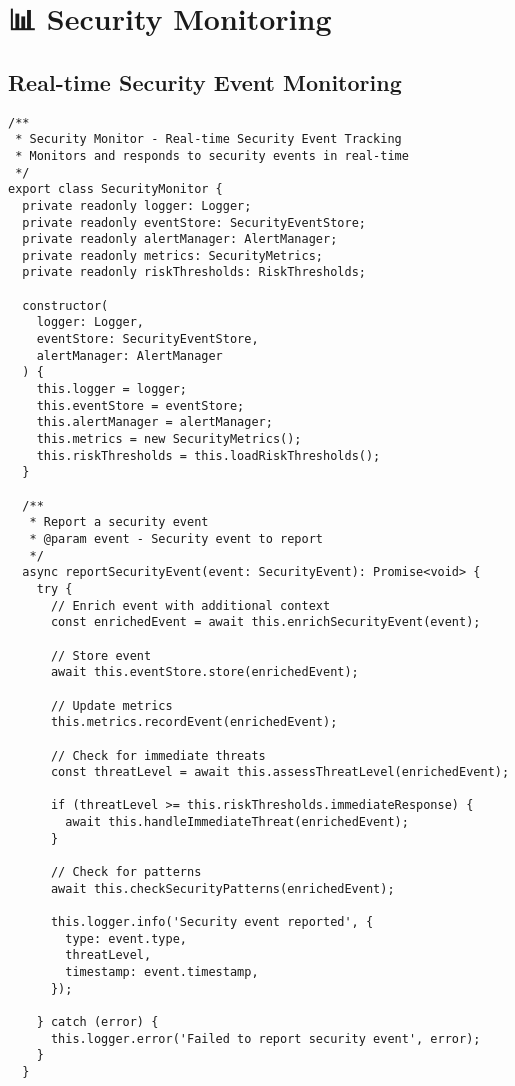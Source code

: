 \documentclass[11pt,a4paper]{article}
\begin{document}
\section{📊 Security Monitoring}

\subsection{Real-time Security Event Monitoring}

\begin{lstlisting}[style=typescript, caption=Security Monitoring System]
/**
 * Security Monitor - Real-time Security Event Tracking
 * Monitors and responds to security events in real-time
 */
export class SecurityMonitor {
  private readonly logger: Logger;
  private readonly eventStore: SecurityEventStore;
  private readonly alertManager: AlertManager;
  private readonly metrics: SecurityMetrics;
  private readonly riskThresholds: RiskThresholds;

  constructor(
    logger: Logger,
    eventStore: SecurityEventStore,
    alertManager: AlertManager
  ) {
    this.logger = logger;
    this.eventStore = eventStore;
    this.alertManager = alertManager;
    this.metrics = new SecurityMetrics();
    this.riskThresholds = this.loadRiskThresholds();
  }

  /**
   * Report a security event
   * @param event - Security event to report
   */
  async reportSecurityEvent(event: SecurityEvent): Promise<void> {
    try {
      // Enrich event with additional context
      const enrichedEvent = await this.enrichSecurityEvent(event);

      // Store event
      await this.eventStore.store(enrichedEvent);

      // Update metrics
      this.metrics.recordEvent(enrichedEvent);

      // Check for immediate threats
      const threatLevel = await this.assessThreatLevel(enrichedEvent);
      
      if (threatLevel >= this.riskThresholds.immediateResponse) {
        await this.handleImmediateThreat(enrichedEvent);
      }

      // Check for patterns
      await this.checkSecurityPatterns(enrichedEvent);

      this.logger.info('Security event reported', {
        type: event.type,
        threatLevel,
        timestamp: event.timestamp,
      });

    } catch (error) {
      this.logger.error('Failed to report security event', error);
    }
  }


\end{lstlisting}
\end{document}
